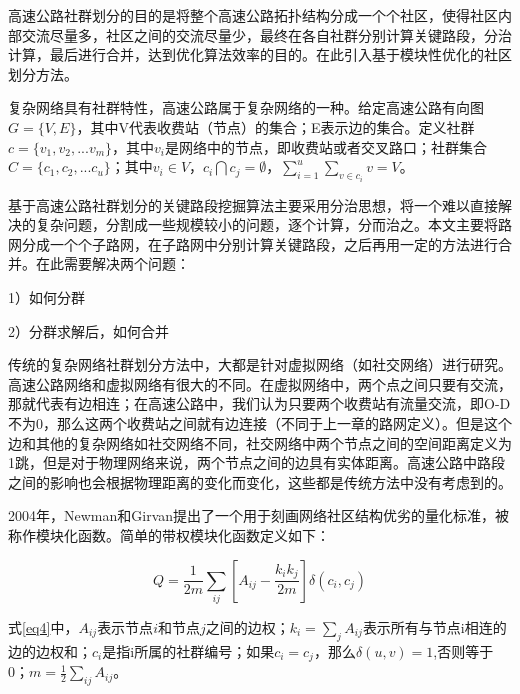 				高速公路社群划分的目的是将整个高速公路拓扑结构分成一个个社区，使得社区内部交流尽量多，社区之间的交流尽量少，最终在各自社群分别计算关键路段，分治计算，最后进行合并，达到优化算法效率的目的。在此引入基于模块性优化的社区划分方法。

				复杂网络具有社群特性，高速公路属于复杂网络的一种。给定高速公路有向图$G=\{V,E\}$，其中V代表收费站（节点）的集合；E表示边的集合。定义社群$c=\{v_1,v_2,...v_m\}$，其中$v_i$是网络中的节点，即收费站或者交叉路口；社群集合$C=\{c_1,c_2,...c_u\}$；其中$v_i \in V$，${c_i}\bigcap {{c_j}}  = \emptyset$，$\sum\limits_{i = 1}^u {\sum\limits_{v \in {c_i}} v  = V}$。

				基于高速公路社群划分的关键路段挖掘算法主要采用分治思想，将一个难以直接解决的复杂问题，分割成一些规模较小的问题，逐个计算，分而治之。本文主要将路网分成一个个子路网，在子路网中分别计算关键路段，之后再用一定的方法进行合并。在此需要解决两个问题：

					1）如何分群

					2）分群求解后，如何合并

				传统的复杂网络社群划分方法中，大都是针对虚拟网络（如社交网络）进行研究。高速公路网络和虚拟网络有很大的不同。在虚拟网络中，两个点之间只要有交流，那就代表有边相连；在高速公路中，我们认为只要两个收费站有流量交流，即O-D不为0，那么这两个收费站之间就有边连接（不同于上一章的路网定义）。但是这个边和其他的复杂网络如社交网络不同，社交网络中两个节点之间的空间距离定义为1跳，但是对于物理网络来说，两个节点之间的边具有实体距离。高速公路中路段之间的影响也会根据物理距离的变化而变化，这些都是传统方法中没有考虑到的。

				2004年，Newman和Girvan\parencite{NewmanBasic}提出了一个用于刻画网络社区结构优劣的量化标准，被称作模块化函数。简单的带权模块化函数定义如下：

				\begin{equation}
				Q = \frac{1}{{2m}}\sum\limits_{ij} {[{A_{ij}} - \frac{{{k_i}{k_j}}}{{2m}}]\delta ({c_i},{c_j})}
				\label{eq4}
				\end{equation}

				式\ref{eq4}中，$A_{ij}$表示节点$i$和节点$j$之间的边权；$k_i=\sum\limits_{j} {A_{ij}}$表示所有与节点i相连的边的边权和；$c_i$是指i所属的社群编号；如果$c_i=c_j$，那么$\delta (u,v)=1$,否则等于0；$m=\frac{1}{{2}}\sum\limits_{ij} {A_{ij}}$。

